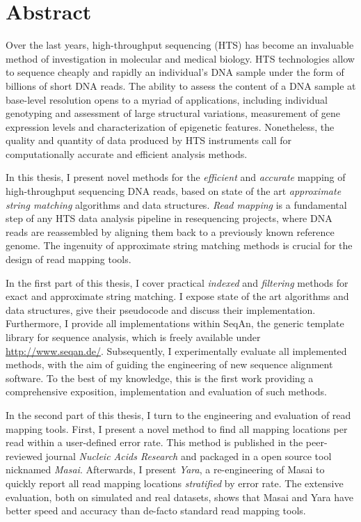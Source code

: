 \section*{Abstract}
\label{sec:abstract:en}

Over the last years, high-throughput sequencing (HTS) has become an invaluable method of investigation in molecular  and medical biology.
HTS technologies allow to sequence cheaply and rapidly an individual's DNA sample under the form of billions of short DNA reads.
The ability to assess the content of a DNA sample at base-level resolution opens to a myriad of applications, including individual genotyping and assessment of large structural variations, measurement of gene expression levels and characterization of epigenetic features.
Nonetheless, the quality and quantity of data produced by HTS instruments call for computationally accurate and efficient analysis methods.

In this thesis, I present novel methods for the \emph{efficient} and \emph{accurate} mapping of high-throughput sequencing DNA reads, based on state of the art \emph{approximate string matching} algorithms and data structures.
\emph{Read mapping} is a fundamental step of any HTS data analysis pipeline in resequencing projects, where DNA reads are reassembled by aligning them back to a previously known reference genome.
The ingenuity of approximate string matching methods is crucial for the design of read mapping tools.

In the first part of this thesis, I cover practical \emph{indexed} and \emph{filtering} methods for exact and approximate string matching.
I expose state of the art algorithms and data structures, give their pseudocode and discuss their implementation.
Furthermore, I provide all implementations within SeqAn, the generic \CC template library for sequence analysis, which is freely available under \url{http://www.seqan.de/}.
Subsequently, I experimentally evaluate all implemented methods, with the aim of guiding the engineering of new sequence alignment software.
To the best of my knowledge, this is the first work providing a comprehensive exposition, implementation and evaluation of such methods.

In the second part of this thesis, I turn to the engineering and evaluation of read mapping tools.
First, I present a novel method to find all mapping locations per read within a user-defined error rate.
This method is published in the peer-reviewed journal \emph{Nucleic Acids Research} and packaged in a open source tool nicknamed \emph{Masai}.
Afterwards, I present \emph{Yara}, a re-engineering of Masai to quickly report all read mapping locations \emph{stratified} by error rate.
The extensive evaluation, both on simulated and real datasets, shows that Masai and Yara have better speed and accuracy than de-facto standard read mapping tools.


\newpage
